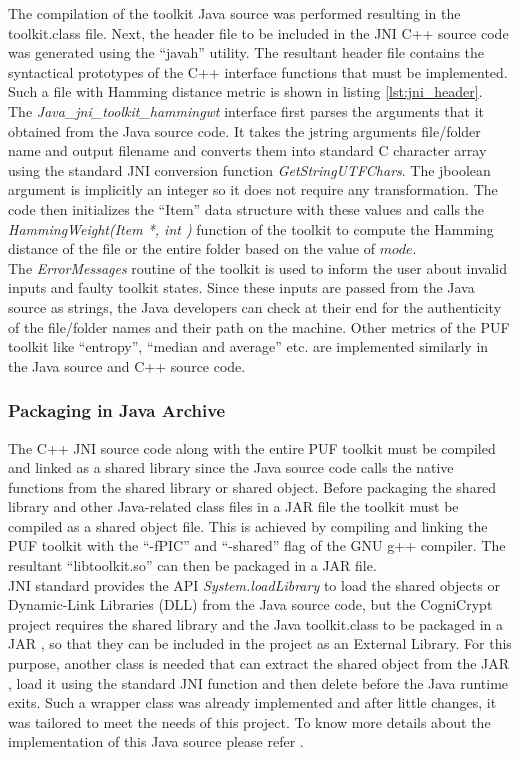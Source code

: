 The compilation of the toolkit Java source was performed resulting in the toolkit.class file. Next, the header file to be included in the JNI C++ source code was generated using the ``javah'' utility. The resultant header file contains the syntactical prototypes of the C++ interface functions that must be implemented. Such a file with Hamming distance metric is shown in listing \ref{lst:jni_header}.\\

The \emph{Java\_jni\_toolkit\_hammingwt} interface first parses the arguments that it obtained from the Java source code. It takes the jstring arguments file/folder name and output filename and converts them into standard C character array using the standard JNI conversion function \emph{GetStringUTFChars}. The jboolean argument is implicitly an integer so it does not require any transformation. The code then initializes the ``Item'' data structure with these values and calls the \emph{HammingWeight(Item *, int )} function of the toolkit to compute the Hamming distance of the file or the entire folder based on the value of $mode$.\\ 

The \emph{ErrorMessages} routine of the toolkit is used to inform the user about invalid inputs and faulty toolkit states. Since these inputs are passed from the Java source as strings, the Java developers can check at their end for the authenticity of the file/folder names and their path on the machine. Other metrics of the PUF toolkit like ``entropy'', ``median and average'' etc. are implemented similarly in the Java source and C++ source code.

\subsubsection{Packaging in Java Archive}
The C++ JNI source code along with the entire PUF toolkit must be compiled and linked as a shared library since the Java source code calls the native functions from the shared library or shared object. Before packaging the shared library and other Java-related class files in a JAR file the toolkit must be compiled as a shared object file. This is achieved by compiling and linking the PUF toolkit with the
``-fPIC'' and ``-shared'' flag of the GNU g++ compiler. The resultant ``libtoolkit.so'' can then be packaged in a JAR file.\\

JNI standard provides the API \emph{System.loadLibrary} to load the shared objects or Dynamic-Link Libraries (DLL) from the Java source code, but the CogniCrypt project requires the shared library and the Java toolkit.class to be packaged in a JAR , so that they can be included in the project as an External Library. For this purpose, another class is needed that can extract the shared object from the JAR , load it using the standard JNI function and then delete before the Java runtime exits. Such
a wrapper class was already implemented and after little changes, it was tailored to meet the needs of this project. To know more details about the implementation of this Java source please refer \cite{nativeutils}.\\

